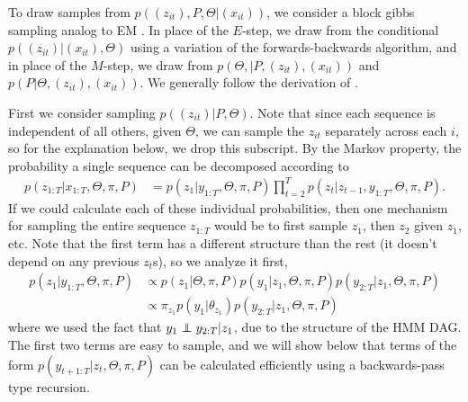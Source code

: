 \documentclass{article}
\begin{document}
To draw samples from $p\left(\left(z_{it}\right), P, \Theta \vert
\left(x_{it}\right)\right)$, we consider a block gibbs sampling analog to EM
\citep{fruhwirth2006finite}. In place of the $E$-step, we draw from the
conditional $p\left(\left(z_{it}\right) \vert \left(x_{it}\right),
\Theta\right)$ using a variation of the forwards-backwards algorithm, and in
place of the $M$-step, we draw from $p\left(\Theta, \vert P, \left(z_{it}\right),
\left(x_{it}\right)\right)$ and $p\left(P \vert \Theta, \left(z_{it}\right),
\left(x_{it}\right)\right)$. We generally follow the derivation of
\citep{fox2009bayesian}.

First we consider sampling $p\left(\left(z_{it}\right) \vert P, \Theta\right)$.
Note that since each sequence is independent of all others, given $\Theta$, we
can sample the $z_{it}$ separately across each $i$, so for the explanation
below, we drop this subscript. By the Markov property, the probability a single
sequence can be decomposed according to
\begin{align}
  \label{eq:sticky_block_z}
p\left(z_{1:T} \vert x_{1:T}, \Theta, \pi, P\right) &= p\left(z_{1} \vert y_{1:T}, \Theta, \pi, P\right) \prod_{t = 2}^{T} p\left(z_{t} \vert z_{t - 1}, y_{1:T}, \Theta, \pi, P\right).
\end{align}
If we could calculate each of these individual probabilities, then one mechanism
for sampling the entire sequence $z_{1:T}$ would be to first sample $z_{1}$,
then $z_{2}$ given $z_{1}$, etc. Note that the first term has a different
structure than the rest (it doesn't depend on any previous $z_{t}$s), so we
analyze it first,
\begin{align*}
  p\left(z_{1} \vert y_{1:T}, \Theta, \pi, P\right) &\propto p\left(z_{1} \vert \Theta, \pi, P\right) p\left(y_{1} \vert z_{1}, \Theta, \pi, P\right) p\left(y_{2:T} \vert z_{1}, \Theta, \pi, P\right) \\
  &\propto \pi_{z_{1}} p\left(y_{1} \vert \theta_{z_{1}}\right) p\left(y_{2:T} \vert z_{1}, \Theta, \pi, P\right)
\end{align*}
where we used the fact that $y_{1} \independent y_{2:T} \vert z_{1}$, due to the
structure of the HMM DAG. The first two terms are easy to sample, and we will
show below that terms of the form $p\left(y_{t + 1:T} \vert z_{t}, \Theta, \pi,
P\right)$ can be calculated efficiently using a backwards-pass type recursion.
\end{document}
